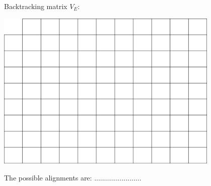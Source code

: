 \documentclass[a4paper,11pt]{article}
\begin{document}
Backtracking matrix $V_E$:
\begin{center}
\includegraphics[width=0.8\textwidth]{matrix.png}
\end{center}
\vspace{0.5cm}

The possible alignments are: ........................
\end{document}
